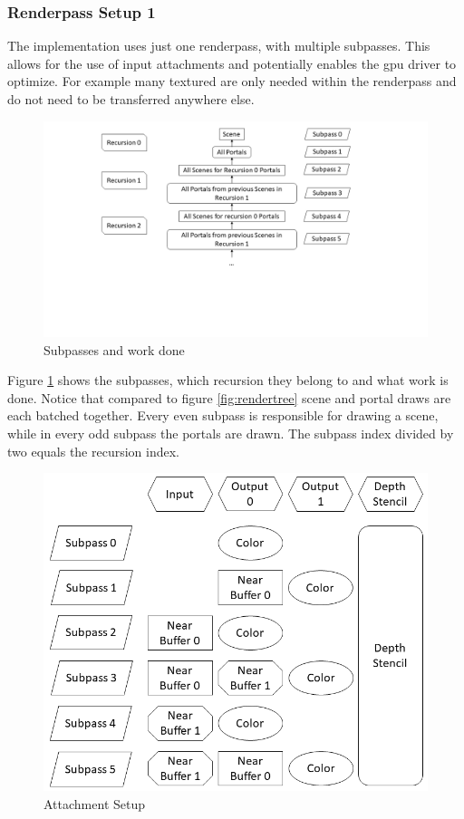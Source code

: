 \subsubsection{Renderpass Setup 1}
\label{section:renderpass}

The implementation uses just one renderpass, with multiple subpasses. This allows for the use of input attachments and potentially enables the \gls{gpu} driver to optimize. For example many textured are only needed within the renderpass and do not need to be transferred anywhere else.

\begin{figure}[h]
	\includegraphics[width=\linewidth]{images/renderpasses.png}
	\caption{Subpasses and work done}
	\label{fig:renderpasses}
\end{figure}


Figure \ref{fig:renderpasses} shows the subpasses, which recursion they belong to and what work is done. Notice that compared to figure \ref{fig:rendertree} scene and portal draws are each batched together. Every even subpass is responsible for drawing a scene, while in every odd subpass the portals are drawn. The subpass index divided by two equals the recursion index. 

\begin{figure}[h]
	\includegraphics[width=\linewidth]{images/attachmentsetup.png}
	\caption{Attachment Setup}
	\label{fig:attachments}
\end{figure}


